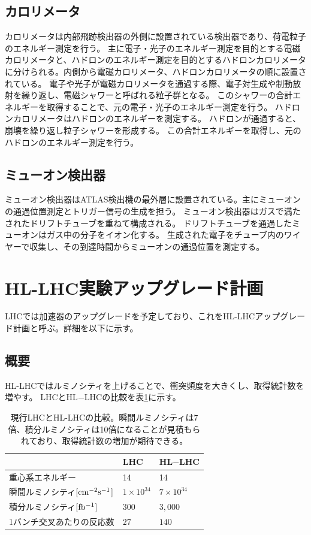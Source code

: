 \subsection{カロリメータ}
カロリメータは内部飛跡検出器の外側に設置されている検出器であり、荷電粒子のエネルギー測定を行う。
主に電子・光子のエネルギー測定を目的とする電磁カロリメータと、ハドロンのエネルギー測定を目的とするハドロンカロリメータに分けられる。内側から電磁カロリメータ、ハドロンカロリメータの順に設置されている。
電子や光子が電磁カロリメータを通過する際、電子対生成や制動放射を繰り返し、電磁シャワーと呼ばれる粒子群となる。
このシャワーの合計エネルギーを取得することで、元の電子・光子のエネルギー測定を行う。
ハドロンカロリメータはハドロンのエネルギーを測定する。
ハドロンが通過すると、崩壊を繰り返し粒子シャワーを形成する。
この合計エネルギーを取得し、元のハドロンのエネルギー測定を行う。

\subsection{ミューオン検出器}
ミューオン検出器はATLAS検出機の最外層に設置されている。主にミューオンの通過位置測定とトリガー信号の生成を担う。
ミューオン検出器はガスで満たされたドリフトチューブを重ねて構成される。
ドリフトチューブを通過したミューオンはガス中の分子をイオン化する。
生成された電子をチューブ内のワイヤーで収集し、その到達時間からミューオンの通過位置を測定する。

\clearpage
\section{HL-LHC実験アップグレード計画}
LHCでは加速器のアップグレードを予定しており、これをHL-LHCアップグレード計画と呼ぶ。詳細を以下に示す。
\subsection{概要}
HL-LHCではルミノシティ\cite{1-13}を上げることで、衝突頻度を大きくし、取得統計数を増やす。
LHCとHL$-$LHCの比較を表\ref{compare_lhc}に示す。

\begin{table}[tbp]
\begin{center}
\caption[現行LHCとHL-LHCの比較]{現行LHCとHL-LHCの比較\cite{1-6}。瞬間ルミノシティは7倍、積分ルミノシティは10倍になることが見積もられており、取得統計数の増加が期待できる。}
\label{compare_lhc}
  \begin{tabular}{|lll|} \hline
    & LHC & HL$-$LHC \\ \hline
    重心系エネルギー & 14 & 14 \\
    瞬間ルミノシティ[$\rm{cm^{-2}s^{-1}}$] & $1\times 10^{34}$ & $7\times10^{34}$ \\
    積分ルミノシティ[$\rm{fb^{-1}}$] & $300$ & $3,000$ \\
    1バンチ交叉あたりの反応数 & $27$ & $140$ \\ \hline 
  \end{tabular}
\end{center}
\end{table}

